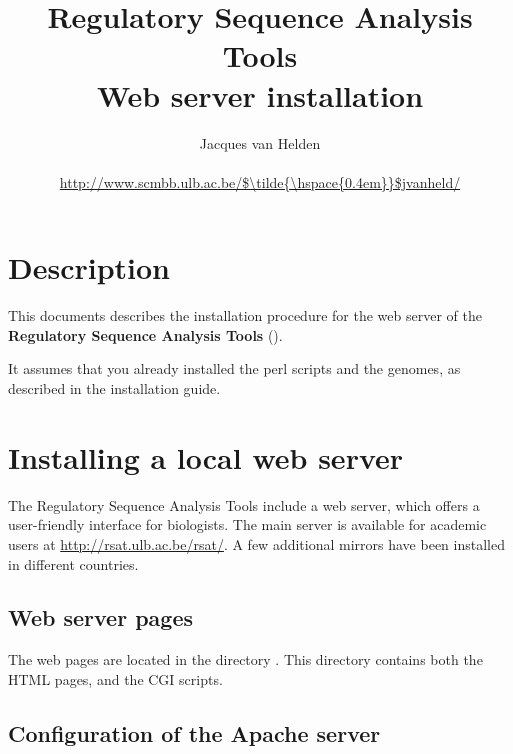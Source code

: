 \documentclass{article}
\begin{document}
\title{Regulatory Sequence Analysis Tools \\
Web server installation}

\author{
	Jacques van Helden \\
	 \\
	\url{http://www.scmbb.ulb.ac.be/$\tilde{\hspace{0.4em}}$jvanheld/} \\
	\scmbb 
}


\maketitle

\newpage
\tableofcontents
\newpage

\section{Description}

This documents describes the installation procedure for the web server
of the \textbf{Regulatory Sequence Analysis Tools} (\RSAT).

It assumes that you already installed the perl scripts and the
genomes, as described in the \RSAT installation guide.


\section{Installing a local web server}

The Regulatory Sequence Analysis Tools include a web server, which
offers a user-friendly interface for biologists. The main server is
available for academic users at \url{http://rsat.ulb.ac.be/rsat/}. A
few additional mirrors have been installed in different countries.

\subsection{Web server pages}

The web pages are located in the directory
. This directory contains both the HTML
pages, and the CGI scripts.

\subsection{Configuration of the Apache server}
\end{document}
